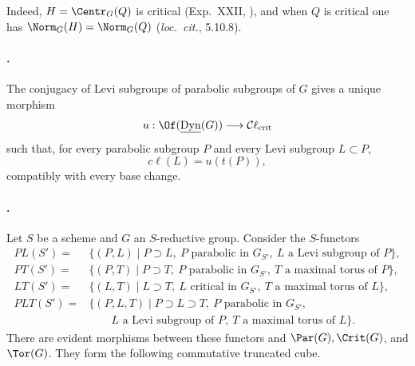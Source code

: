 Indeed, \(H=\Centr_G(Q)\) is critical (Exp.\ XXII, ), and when
\(Q\) is critical one has
\(\Norm_G(H)=\Norm_G(Q)\) (\emph{loc.\ cit.}, 5.10.8).

\paragraph{.}
The conjugacy of Levi subgroups of parabolic subgroups of \(G\) gives a
unique morphism
\[
 u:\Of(\underline{\operatorname{Dyn}}(G))
 \longrightarrow\mathcal C\ell_{\mathrm{crit}}
\]
such that, for every parabolic subgroup \(P\) and every Levi subgroup
\(L\subset P\),
\[
 c\ell(L)=u(t(P)),
\]
compatibly with every base change.

\paragraph{.}
Let \(S\) be a scheme and \(G\) an \(S\)-reductive group.  Consider the
\(S\)-functors
\[
\begin{aligned}
 PL(S')={}&\{(P,L)\mid P\supset L,\ P\text{ parabolic in }G_{S'},\
                    L\text{ a Levi subgroup of }P\},\\
 PT(S')={}&\{(P,T)\mid P\supset T,\ P\text{ parabolic in }G_{S'},\
                    T\text{ a maximal torus of }P\},\\
 LT(S')={}&\{(L,T)\mid L\supset T,\ L\text{ critical in }G_{S'},\
                    T\text{ a maximal torus of }L\},\\
 PLT(S')={}&\{(P,L,T)\mid P\supset L\supset T,\ P\text{ parabolic in }G_{S'},\\
           &\qquad L\text{ a Levi subgroup of }P,\ T\text{ a maximal torus of }L\}.
\end{aligned}
\]
There are evident morphisms between these functors and
\(\Par(G),\Crit(G)\), and \(\Tor(G)\).  They form the following
commutative truncated cube.

